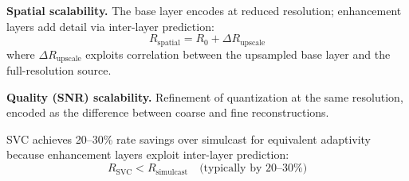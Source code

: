 \textbf{Spatial scalability.} The base layer encodes at reduced resolution;
enhancement layers add detail via inter-layer prediction:
\begin{equation}
  R_{\text{spatial}} = R_0 + \Delta R_{\text{upscale}}
  \label{eq:spatial-svc}
\end{equation}
where $\Delta R_{\text{upscale}}$ exploits correlation between the
upsampled base layer and the full-resolution source.

\textbf{Quality (SNR) scalability.} Refinement of quantization at the same
resolution, encoded as the difference between coarse and fine
reconstructions.

SVC achieves 20--30\% rate savings over simulcast for equivalent
adaptivity because enhancement layers exploit inter-layer prediction:
\begin{equation}
  R_{\text{SVC}} < R_{\text{simulcast}} \quad
  \text{(typically by 20--30\%)}
  \label{eq:svc-advantage}
\end{equation}

